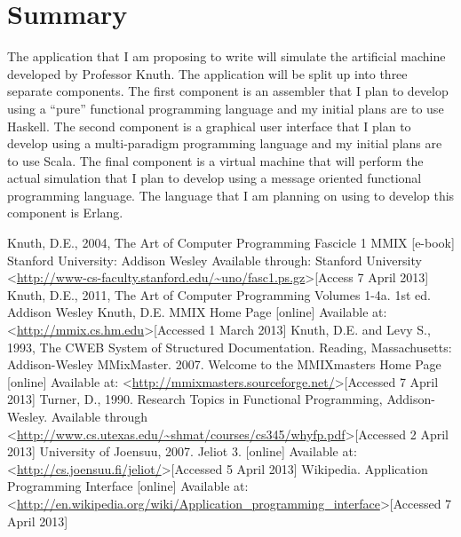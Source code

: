 \documentclass[11pt]{article} %
\begin{document}
\section{Summary}
The application that I am proposing to write will simulate the artificial machine developed by Professor Knuth\cite{knuth:aocp1}. The application will be split up into three separate components. The first component is an assembler that I plan to develop using a ``pure'' functional programming language and my initial plans are to use Haskell. The second component is a graphical user interface that I plan to develop using a multi-paradigm programming language and my initial plans are to use Scala. The final component is a virtual machine that will perform the actual simulation that I plan to develop using a message oriented functional programming language. The language that I am planning on using to develop this component is Erlang.
\begin{thebibliography}{99}
	Knuth, D.E., 2004, The Art of Computer Programming Fascicle 1 MMIX [e-book] Stanford University: Addison Wesley Available through: Stanford University \textless\url{http://www-cs-faculty.stanford.edu/~uno/fasc1.ps.gz}\textgreater [Access 7 April 2013]
	Knuth, D.E., 2011, The Art of Computer Programming Volumes 1-4a. 1st ed. Addison Wesley
	Knuth, D.E. MMIX Home Page [online] Available at: \textless\url{http://mmix.cs.hm.edu}\textgreater [Accessed 1 March 2013]
	Knuth, D.E. and Levy S., 1993, The CWEB System of Structured Documentation. Reading, Massachusetts: Addison-Wesley
	MMixMaster. 2007. Welcome to the MMIXmasters Home Page [online] Available at: \textless\url{http://mmixmasters.sourceforge.net/}\textgreater [Accessed 7 April 2013]
	Turner, D., 1990. Research Topics in Functional Programming, Addison-Wesley. Available through \textless \url{http://www.cs.utexas.edu/~shmat/courses/cs345/whyfp.pdf}\textgreater [Accessed 2 April 2013]
	University of Joensuu, 2007. Jeliot 3. [online] Available at: \textless\url{http://cs.joensuu.fi/jeliot/}\textgreater [Accessed 5 April 2013]
	Wikipedia. Application Programming Interface [online] Available at: \textless\url{http://en.wikipedia.org/wiki/Application_programming_interface}\textgreater [Accessed 7 April 2013]
\end{thebibliography}
\end{document}
